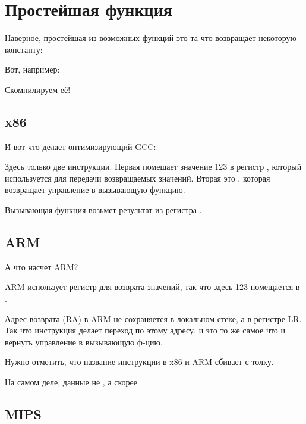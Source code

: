\section{Простейшая функция}

Наверное, простейшая из возможных функций это та что возвращает некоторую константу:

Вот, например:



Скомпилируем её!

\subsection{x86}

И вот что делает оптимизирующий GCC:



Здесь только две инструкции. Первая помещает значение 123 в регистр \EAX, который используется
для передачи возвращаемых значений. Вторая это \RET, которая возвращает управление в вызывающую функцию.

Вызывающая функция возьмет результат из регистра \EAX.

\subsection{ARM}

А что насчет ARM?



ARM использует регистр  для возврата значений, так что здесь 123 помещается в .

Адрес возврата (\ac{RA}) в ARM не сохраняется в локальном стеке, а в регистре \ac{LR}.
Так что инструкция  делает переход по этому адресу, и это то же самое что и вернуть управление
в вызывающую ф-цию.

Нужно отметить, что название инструкции \MOV в x86 и ARM сбивает с толку.

На самом деле, данные не , а скорее .

\subsection{MIPS}

